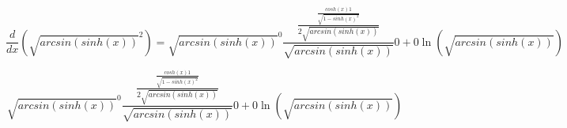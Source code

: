 \documentclass{article}
\begin{document}
\begin{equation}
\frac{d}{dx}({\sqrt{arcsin(sinh(x))}}^{2}) = {\sqrt{arcsin(sinh(x))}}^{0}\frac{\frac{\frac{cosh(x)1}{\sqrt{1-{sinh(x)}^{2}}}}{2\sqrt{arcsin(sinh(x))}}}{\sqrt{arcsin(sinh(x))}}0+0\ln(\sqrt{arcsin(sinh(x))})
\end{equation}

\begin{equation}
{\sqrt{arcsin(sinh(x))}}^{0}\frac{\frac{\frac{cosh(x)1}{\sqrt{1-{sinh(x)}^{2}}}}{2\sqrt{arcsin(sinh(x))}}}{\sqrt{arcsin(sinh(x))}}0+0\ln(\sqrt{arcsin(sinh(x))})
\end{equation}
\end{document}
